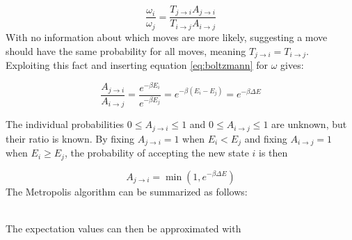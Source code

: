 \documentclass{article}
\begin{document}
\begin{equation}
\frac{\omega_i}{\omega_j} = \frac{T_{j\rightarrow i}A_{j\rightarrow i}}{T_{i\rightarrow j}A_{i\rightarrow j}}
\end{equation}
With no information about which moves are more likely, suggesting a move should have the same probability for all moves, meaning $T_{j\rightarrow i}=T_{i\rightarrow j}$. Exploiting this fact and inserting equation \ref{eq:boltzmann} for $\omega$ gives:

\begin{equation}
\frac{A_{j\rightarrow i}}{A_{i\rightarrow j}} = \frac{e^{-\beta E_i}}{e^{-\beta E_j}} = e^{-\beta(E_i - E_j)} = e^{-\beta \Delta E}
\end{equation}

The individual probabilities $0 \leq A_{j\rightarrow i} \leq 1$ and $0 \leq A_{i\rightarrow j} \leq 1$ are unknown, but their ratio is known. By fixing $A_{j\rightarrow i}=1$ when $E_i < E_j$ and fixing $A_{i\rightarrow j}=1$ when $E_i \geq E_j$, the probability of accepting the new state $i$ is then

\begin{equation}
A_{j\rightarrow i} = \min(1, e^{-\beta \Delta E})
\end{equation}
The Metropolis algorithm can be summarized as follows:

 \\ 

\noindent The expectation values can then be approximated with 
\end{document}
